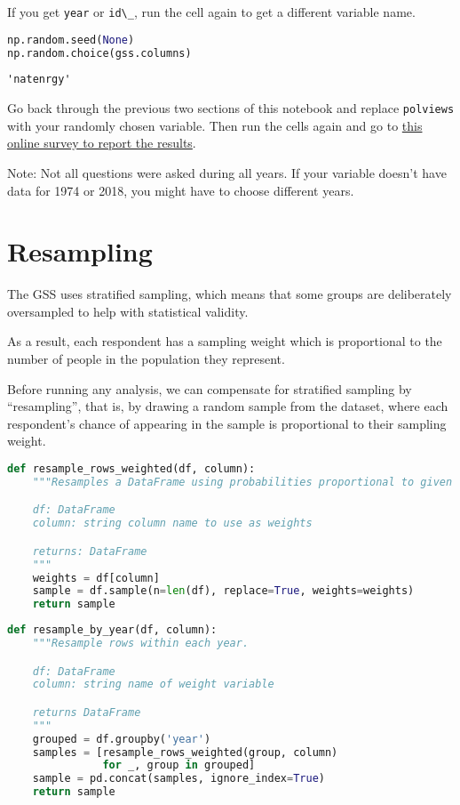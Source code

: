 If you get \passthrough{\lstinline!year!} or
\passthrough{\lstinline!id\_!}, run the cell again to get a different
variable name.

\begin{lstlisting}[language=Python]
np.random.seed(None)
np.random.choice(gss.columns)
\end{lstlisting}

\begin{lstlisting}[]
'natenrgy'
\end{lstlisting}

Go back through the previous two sections of this notebook and replace
\passthrough{\lstinline!polviews!} with your randomly chosen variable.
Then run the cells again and go to
\href{https://forms.gle/tmST8YCu4qLc414F7}{this online survey to report
the results}.

Note: Not all questions were asked during all years. If your variable
doesn't have data for 1974 or 2018, you might have to choose different
years.

\hypertarget{resampling}{%
\section{Resampling}\label{resampling}}

The GSS uses stratified sampling, which means that some groups are
deliberately oversampled to help with statistical validity.

As a result, each respondent has a sampling weight which is proportional
to the number of people in the population they represent.

Before running any analysis, we can compensate for stratified sampling
by ``resampling'', that is, by drawing a random sample from the dataset,
where each respondent's chance of appearing in the sample is
proportional to their sampling weight.

\begin{lstlisting}[language=Python]
def resample_rows_weighted(df, column):
    """Resamples a DataFrame using probabilities proportional to given column.

    df: DataFrame
    column: string column name to use as weights

    returns: DataFrame
    """
    weights = df[column]
    sample = df.sample(n=len(df), replace=True, weights=weights)
    return sample
\end{lstlisting}

\begin{lstlisting}[language=Python]
def resample_by_year(df, column):
    """Resample rows within each year.

    df: DataFrame
    column: string name of weight variable

    returns DataFrame
    """
    grouped = df.groupby('year')
    samples = [resample_rows_weighted(group, column)
               for _, group in grouped]
    sample = pd.concat(samples, ignore_index=True)
    return sample
\end{lstlisting}

